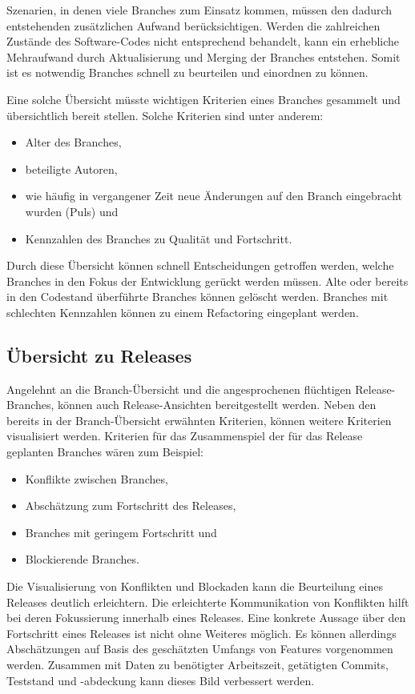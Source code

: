 Szenarien, in denen viele Branches zum Einsatz kommen, müssen den dadurch entstehenden zusätzlichen Aufwand berücksichtigen. Werden die zahlreichen Zustände des Software-Codes nicht entsprechend behandelt, kann ein erhebliche Mehraufwand durch Aktualisierung und Merging der Branches entstehen. Somit ist es notwendig Branches schnell zu beurteilen und einordnen zu können.

Eine solche Übersicht müsste wichtigen Kriterien eines Branches gesammelt und übersichtlich bereit stellen. Solche Kriterien sind unter anderem:
\begin{itemize}
\item Alter des Branches,
\item beteiligte Autoren,
\item wie häufig in vergangener Zeit neue Änderungen auf den Branch eingebracht wurden (Puls) und
\item Kennzahlen des Branches zu Qualität und Fortschritt.
\end{itemize}

Durch diese Übersicht können schnell Entscheidungen getroffen werden, welche Branches in den Fokus der Entwicklung gerückt werden müssen. Alte oder bereits in den Codestand überführte Branches können gelöscht werden. Branches mit schlechten Kennzahlen können zu einem Refactoring eingeplant werden. 

\subsection{Übersicht zu Releases}

Angelehnt an die Branch-Übersicht und die angesprochenen \glqq flüchtigen\grqq{} Release-Branches, können auch Release-Ansichten bereitgestellt werden. Neben den bereits in der Branch-Übersicht erwähnten Kriterien, können weitere Kriterien visualisiert werden. Kriterien für das Zusammenspiel der für das Release geplanten Branches wären zum Beispiel:
\begin{itemize}
\item Konflikte zwischen Branches,
\item Abschätzung zum Fortschritt des Releases,
\item Branches mit geringem Fortschritt und
\item Blockierende Branches.
\end{itemize}

Die Visualisierung von Konflikten und Blockaden kann die Beurteilung eines Releases deutlich erleichtern. Die erleichterte Kommunikation von Konflikten hilft bei deren Fokussierung innerhalb eines Releases. Eine konkrete Aussage über den Fortschritt eines Releases ist nicht ohne Weiteres möglich. Es können allerdings Abschätzungen auf Basis des geschätzten Umfangs von Features vorgenommen werden. Zusammen mit Daten zu benötigter Arbeitszeit, getätigten Commits, Teststand und -abdeckung kann dieses Bild verbessert werden.

